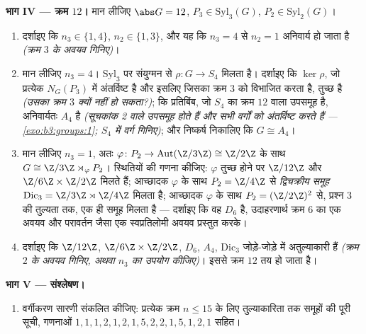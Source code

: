 \begin{problem}
\medskip
\noindent\textbf{भाग IV --- क्रम $12$।} मान लीजिए $\abs G = 12$,
$P_3
\in \mathrm{Syl}_3(G)$, $P_2 \in \mathrm{Syl}_2(G)$।
\begin{enumerate}[resume]
  \item दर्शाइए कि $n_3 \in \{1, 4\}$, $n_2 \in \{1, 3\}$, और यह कि $n_3
        = 4$ से $n_2 = 1$
        अनिवार्य हो जाता है \emph{(क्रम $3$ के अवयव गिनिए)}।
  \item मान लीजिए $n_3 = 4$। $\mathrm{Syl}_3$ पर संयुग्मन  से $\rho \colon G \to S_4$
        मिलता है। दर्शाइए कि $\ker \rho$, जो प्रत्येक $N_G(P_3)$ में
        अंतर्विष्ट है और इसलिए जिसका क्रम $3$ को विभाजित करता
        है, तुच्छ है \emph{(उसका क्रम $3$ क्यों नहीं हो सकता?)};
        कि प्रतिबिंब, जो $S_4$ का क्रम $12$ वाला उपसमूह है,
        अनिवार्यतः $A_4$ है \emph{(सूचकांक 2 वाले उपसमूह
         होते हैं और सभी वर्गों को अंतर्विष्ट करते
        हैं --- \cref{exo:b3:groups:1}; $S_4$ में वर्ग गिनिए)}; और निष्कर्ष
        निकालिए कि $G \cong A_4$।
  \item मान लीजिए $n_3 = 1$, अतः $\varphi \colon P_2 \to \operatorname{Aut}(\Z/3\Z)
        \cong \Z/2\Z$ के साथ $G \cong \Z/3\Z \rtimes_\varphi P_2$। स्थितियों
        की गणना कीजिए: $\varphi$ तुच्छ होने पर $\Z/12\Z$ और $\Z/6\Z \times \Z/2\Z$
        मिलते हैं; आच्छादक $\varphi$ के साथ $P_2 =
        \Z/4\Z$ से
        \emph{द्विचक्रीय समूह} $\mathrm{Dic}_3 = \Z/3\Z \rtimes
        \Z/4\Z$ मिलता है; आच्छादक $\varphi$
        के साथ $P_2 = (\Z/2\Z)^2$ से, प्रश्न 3 की तुल्यता तक, एक ही समूह
        मिलता है --- दर्शाइए कि वह $D_6$ है, उदाहरणार्थ क्रम
        $6$ का एक अवयव और परावर्तन जैसा एक स्वप्रतिलोमी अवयव
        प्रस्तुत करके।
  \item दर्शाइए कि $\Z/12\Z$, $\Z/6\Z \times \Z/2\Z$, $D_6$, $A_4$, $\mathrm{Dic}_3$
        जोड़े-जोड़े में अतुल्याकारी हैं \emph{(क्रम $2$ के
        अवयव गिनिए, अथवा $n_3$ का उपयोग कीजिए)}। इससे क्रम
        $12$ तय हो जाता है।
\end{enumerate}

\medskip
\noindent\textbf{भाग V --- संश्लेषण।}
\begin{enumerate}[resume]
  \item वर्गीकरण सारणी संकलित कीजिए: प्रत्येक क्रम $n \leq
        15$ के लिए
        तुल्याकारिता तक समूहों की पूरी सूची, गणनाओं $1, 1, 1, 2, 1, 2, 1, 5, 2, 2, 1, 5, 1, 2, 1$ सहित।
\end{enumerate}


\end{problem}
